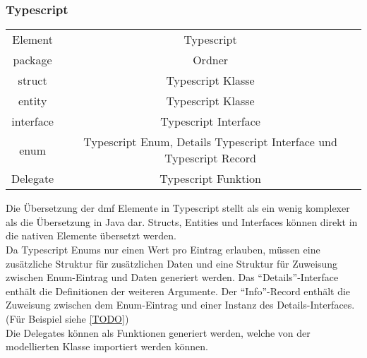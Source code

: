 \documentclass[./einleitung.tex]{subfiles}
\begin{document}
    \subsubsection{Typescript}
    \begin{center}
        \begin{tabular}{| c || c |}
            \hline
            Element   & Typescript           \\
            \hhline{|=||=|}
            package   & Ordner               \\
            \hline
            struct    & Typescript Klasse    \\
            \hline
            entity    & Typescript Klasse    \\
            \hline
            interface & Typescript Interface \\
            \hline
            enum      & Typescript Enum, Details Typescript Interface und Typescript Record   \\
            \hline
            Delegate  & Typescript Funktion    \\
            \hline
        \end{tabular}
    \end{center}
    Die Übersetzung der \acrshort{dmf} Elemente in Typescript stellt als ein wenig komplexer als die Übersetzung in Java dar.
    Structs, Entities und Interfaces können direkt in die nativen Elemente übersetzt werden.\\
    Da Typescript Enums nur einen Wert pro Eintrag erlauben, müssen eine zusätzliche Struktur für zusätzlichen Daten und eine Struktur für Zuweisung zwischen Enum-Eintrag und Daten generiert werden.
    Das ``Details''-Interface enthält die Definitionen der weiteren Argumente.
    Der ``Info''-Record enthält die Zuweisung zwischen dem Enum-Eintrag und einer Instanz des Details-Interfaces. (Für Beispiel siehe \ref{TODO})\\ %
    Die Delegates können als Funktionen generiert werden, welche von der modellierten Klasse importiert werden können.
\end{document}
